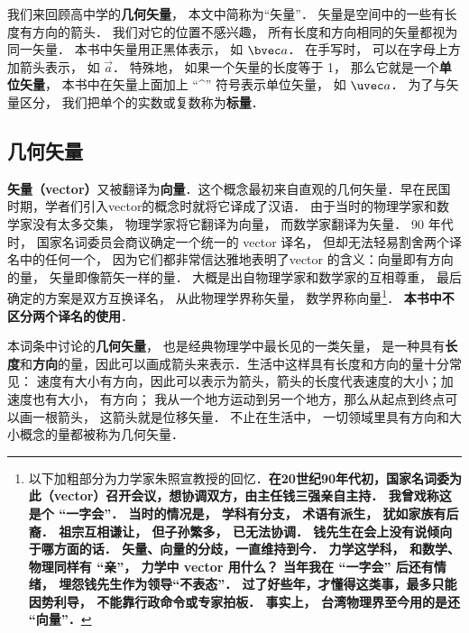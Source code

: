 

我们来回顾高中学的\textbf{几何矢量}， 本文中简称为“矢量”． 矢量是空间中的一些有长度有方向的箭头． 我们对它的位置不感兴趣， 所有长度和方向相同的矢量都视为同一矢量． 本书中矢量用正黑体表示， 如 $\bvec a$． 在手写时， 可以在字母上方加箭头表示， 如 $\overrightarrow{a}$． 特殊地， 如果一个矢量的长度等于 1， 那么它就是一个\textbf{单位矢量}， 本书中在矢量上面加上 “\^{}” 符号表示单位矢量， 如 $\uvec a$． 为了与矢量区分， 我们把单个的实数或复数称为\textbf{标量}．

\subsection{几何矢量}

\textbf{矢量（vector）}又被翻译为\textbf{向量}．这个概念最初来自直观的几何矢量．早在民国时期，学者们引入vector的概念时就将它译成了汉语． 由于当时的物理学家和数学家没有太多交集， 物理学家将它翻译为向量， 而数学家翻译为矢量． 90 年代时， 国家名词委员会商议确定一个统一的 vector 译名， 但却无法轻易割舍两个译名中的任何一个， 因为它们都非常信达雅地表明了vector 的含义：向量即有方向的量， 矢量即像箭矢一样的量． 大概是出自物理学家和数学家的互相尊重， 最后确定的方案是双方互换译名， 从此物理学界称矢量， 数学界称向量\footnote{以下加粗部分为力学家朱照宣教授的回忆．\textbf{在20世纪90年代初，国家名词委为此（vector）召开会议，想协调双方，由主任钱三强亲自主持． 我曾戏称这是个 “一字会”． 当时的情况是， 学科有分支， 术语有派生， 犹如家族有后裔． 祖宗互相谦让， 但子孙繁多， 已无法协调． 钱先生在会上没有说倾向于哪方面的话． 矢量、向量的分歧，一直维持到今． 力学这学科， 和数学、物理同样有 “亲”， 力学中 vector 用什么？ 当年我在 “一字会” 后还有情绪， 埋怨钱先生作为领导“不表态”． 过了好些年，才懂得这类事，最多只能因势利导， 不能靠行政命令或专家拍板． 事实上， 台湾物理界至今用的是还 “向量”．}}． \textbf{本书中不区分两个译名的使用}．

本词条中讨论的\textbf{几何矢量}， 也是经典物理学中最长见的一类矢量， 是一种具有\textbf{长度}和\textbf{方向}的量，因此可以画成箭头来表示．生活中这样具有长度和方向的量十分常见： 速度有大小有方向，因此可以表示为箭头，箭头的长度代表速度的大小；加速度也有大小， 有方向； 我从一个地方运动到另一个地方，那么从起点到终点可以画一根箭头， 这箭头就是位移矢量． 不止在生活中， 一切领域里具有方向和大小概念的量都被称为几何矢量． 

